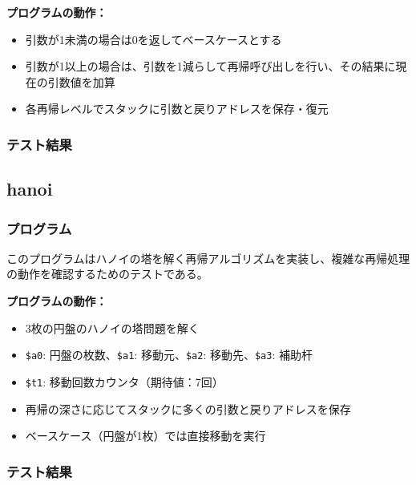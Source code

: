 \documentclass[dvipdfmx]{jsarticle}
\begin{document}


\textbf{プログラムの動作：}
\begin{itemize}
\item 引数が1未満の場合は0を返してベースケースとする
\item 引数が1以上の場合は、引数を1減らして再帰呼び出しを行い、その結果に現在の引数値を加算
\item 各再帰レベルでスタックに引数と戻りアドレスを保存・復元
\end{itemize}

\subsubsection{テスト結果}


\subsection{hanoi}
\label{appendix:hanoi}

\subsubsection{プログラム}
このプログラムはハノイの塔を解く再帰アルゴリズムを実装し、複雑な再帰処理の動作を確認するためのテストである。



\textbf{プログラムの動作：}
\begin{itemize}
\item 3枚の円盤のハノイの塔問題を解く
\item \texttt{\$a0}: 円盤の枚数、\texttt{\$a1}: 移動元、\texttt{\$a2}: 移動先、\texttt{\$a3}: 補助杆
\item \texttt{\$t1}: 移動回数カウンタ（期待値：7回）
\item 再帰の深さに応じてスタックに多くの引数と戻りアドレスを保存
\item ベースケース（円盤が1枚）では直接移動を実行
\end{itemize}

\subsubsection{テスト結果}





\end{document}
